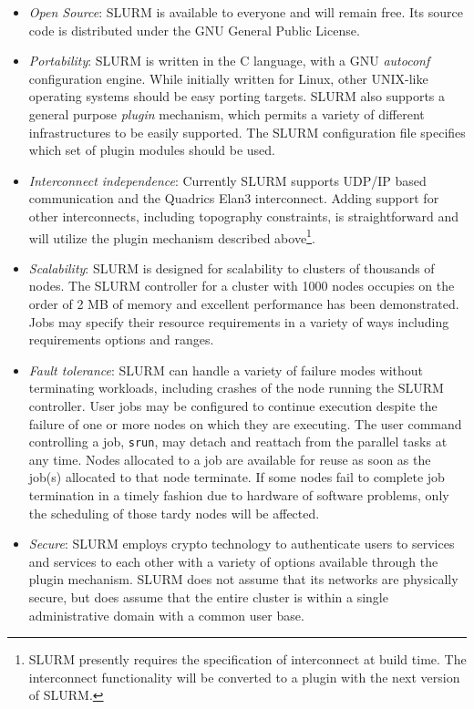 \documentclass[10pt,onecolumn,times]{../common/llncs}
\begin{document}
{\begin{itemize}
\item {\em Open Source}: SLURM is available to everyone and will remain free. 
Its source code is distributed under the GNU General Public 
License\cite{GPL2002}.

\item {\em Portability}: SLURM is written in the C language, with a GNU 
{\em autoconf} configuration engine.  
While initially written for Linux, other UNIX-like operating systems 
should be easy porting targets.
SLURM also supports a general purpose {\em plugin} mechanism, which 
permits a variety of different infrastructures to be easily supported. 
The SLURM configuration file specifies which set of plugin modules 
should be used. 

\item {\em Interconnect independence}: Currently SLURM supports UDP/IP based
communication and the Quadrics Elan3 interconnect.  Adding support for 
other interconnects, including topography constraints, is straightforward 
and will utilize the plugin mechanism described above\footnote{SLURM 
presently requires the specification of interconnect at build time. 
The interconnect functionality will be converted to a plugin with the 
next version of SLURM.}.

\item {\em Scalability}: SLURM is designed for scalability to clusters of
thousands of nodes. The SLURM controller for a cluster with 1000 nodes
occupies on the order of 2 MB of memory and excellent performance has
been demonstrated.  Jobs may specify their resource requirements in a
variety of ways including requirements options and ranges.

\item {\em Fault tolerance}: SLURM can handle a variety of failure
modes without terminating workloads, including crashes of the node
running the SLURM controller.  User jobs may be configured to continue
execution despite the failure of one or more nodes on which they are
executing.  The user command controlling a job, {\tt srun}, may detach
and reattach from the parallel tasks at any time.  Nodes allocated to
a job are available for reuse as soon as the job(s) allocated to that
node terminate.  If some nodes fail to complete job termination in a
timely fashion due to hardware of software problems, only the scheduling
of those tardy nodes will be affected.

\item {\em Secure}: SLURM employs crypto technology to authenticate
users to services and services to each other with a variety of options
available through the plugin mechanism.  SLURM does not assume that its
networks are physically secure, but does assume that the entire cluster
is within a single administrative domain with a common user base.


\end{itemize}}
\end{document}
